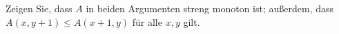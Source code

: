 
\begin{exercise}[208]

Zeigen Sie, dass $A$ in beiden Argumenten streng monoton ist; außerdem, dass
$A(x,y+1) \leq A(x+1,y)$ für alle $x,y$ gilt.

\end{exercise}


\begin{solution}

	\phantom{}

\end{solution}
